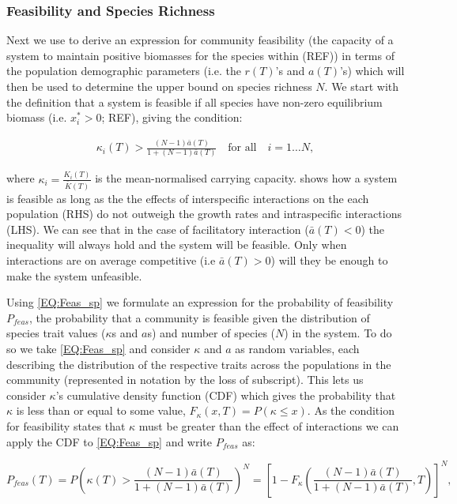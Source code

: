 \documentclass{article}
\begin{document}
\subsubsection{Feasibility and Species Richness} \label{SEC:Feas_SP_rich}
Next we use  to derive an expression for community feasibility (the capacity of a system to maintain positive biomasses for the species within (REF)) in terms of the population demographic parameters (i.e. the $r(T)$'s and $a(T)$'s) which will then be used to determine the upper bound on species richness $N$. We start with the definition that a system is feasible if all species have non-zero equilibrium biomass (i.e. $x_i^* > 0 $; REF), giving the condition:

\begin{align} \label{EQ:Feas_sp}
  \kappa_i(T) > \frac{(N-1)\bar{a}(T)}{1 + (N-1)\bar{a}(T)} \quad \text{for all} \quad i = 1 \ldots N,
\end{align}

where $\kappa_i = \frac{K_i(T)}{\bar{K}(T)}$ is the mean-normalised carrying capacity.  shows how a system is feasible as long as the the effects of interspecific interactions on the each population (RHS) do not outweigh the growth rates and intraspecific interactions (LHS). We can see that in the case of facilitatory interaction ($\bar{a}(T) < 0$) the inequality will always hold and the system will be feasible. Only when interactions are on average competitive (i.e $\bar{a}(T) > 0$) will they be enough to make the system unfeasible. 

Using \cref{EQ:Feas_sp} we formulate an expression for the probability of feasibility $P_{feas}$, the probability that a community is feasible given the distribution of species trait values ($\kappa$s and $a$s) and number of species ($N$) in the system. To do so we take \cref{EQ:Feas_sp} and consider $\kappa$ and $a$ as random variables, each describing the distribution of the respective traits across the populations in the community (represented in notation by the loss of subscript). This lets us consider $\kappa$'s cumulative density function (CDF) which gives the probability that $\kappa$ is less than or equal to some value, $F_{\kappa}(x,T) = P(\kappa \leq x)$. As the condition for feasibility states that $\kappa$ must be greater than the effect of interactions we can apply the CDF to \cref{EQ:Feas_sp} and write $P_{feas}$ as:

\begin{equation} \label{EQ:P_feas}
    P_{feas}(T) = P \left( \kappa(T) > \frac{(N-1)\bar{a}(T)}{1 + (N-1)\bar{a}(T)}  \right)^N = 
    \left[1 - F_{\kappa}\left(\frac{(N-1)\bar{a}(T)}{1 + (N-1)\bar{a}(T)},T \right)\right]^N,
\end{equation}
\end{document}

